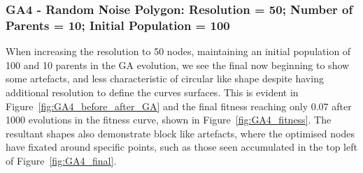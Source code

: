 \documentclass{article}
\begin{document}
\subsubsection*{GA4 - Random Noise Polygon: Resolution = 50; Number of Parents = 10; Initial Population = 100}
When increasing the resolution to 50 nodes, maintaining an initial population of 100 and 10 parents in the GA evolution, we see the final now beginning to show some artefacts, and less characteristic of circular like shape despite having additional resolution to define the curves surfaces. This is evident in Figure~\ref{fig:GA4_before_after_GA} and the final fitness reaching only 0.07 after 1000 evolutions in the fitness curve, shown in Figure~\ref{fig:GA4_fitness}. The resultant shapes also demonstrate block like artefacts, where the optimised nodes have fixated around specific points, such as those seen accumulated in the top left of Figure~\ref{fig:GA4_final}.
\end{document}

